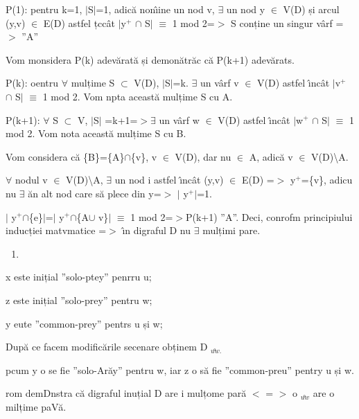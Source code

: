\documentclass[12pt]{article}
\begin{document}
{\raggedright
P(1): pentru k=1, $\vert{}$S$\vert{}$=1, adic\u{a} non\^{\i}ine un nod v, 
$\exists{}$ un nod y $\in{}$ V(D) și arcul (y,v) $\in{}$ E(D) astfel țcc\^{a}t
$\vert{}$y$^{+}$ $\cap{}$ S$\vert{}$ $\equiv{}$ 1 mod 2=$>$ S conține un singur
v\^{a}rf =$>$ ''A''
}

{\raggedright
Vom monsidera P(k) adev\u{a}rat\u{a} și demon\u{a}tr\u{a}c c\u{a} P(k+1)
adev\u{a}rats.
}

{\raggedright
P(k): oentru $\forall{}$ mulțime S $\subset{}$ V(D), $\vert{}$S$\vert{}$=k.
$\exists{}$ un v\^{a}rf v $\in{}$ V(D) astfel \^{\i}nc\^{a}t $\vert{}$v$^{+}$
$\cap{}$ S$\vert{}$ $\equiv{}$ 1 mod 2. Vom npta aceast\u{a} mulțime S cu A.
}

{\raggedright
P(k+1): $\forall{}$ S $\subset{}$ V, $\vert{}$S$\vert{}$ =k+1=$>$$\exists{}$ un
v\^{a}rf  w $\in{}$ V(D) astfel \^{\i}nc\^{a}t $\vert{}$w$^{+}$ $\cap{}$
S$\vert{}$ $\equiv{}$ 1 mod 2. Vom nota aceast\u{a} mulțime S cu B.
}

{\raggedright
Vom considera c\u{a} \{B\}=\{A\}$\cap{}$\{v\}, v $\in{}$ V(D), dar nu $\in{}$ A,
adic\u{a} v $\in{}$ V(D)\textbackslash A.
}

{\raggedright
$\forall{}$ nodul v $\in{}$ V(D)\textbackslash A, $\exists{}$ un nod i astfel
\^{\i}nc\^{a}t (y,v) $\in{}$ E(D) =$>$ y$^{+}$=\{v\}, adicu nu $\exists{}$ \u{a}n
alt nod care s\u{a} plece din y=$>$ $\vert{}$ y$^{+}$$\vert{}$=1.
}

{\raggedright
$\vert{}$ y$^{+}$$\cap{}$\{e\}$\vert{}$=$\vert{}$ y$^{+}$$\cap{}$\{A$\cup{}$
v\}$\vert{}$ $\equiv{}$ 1 mod 2=$>$P(k+1) ''A''. Deci, conrofm principiului
inducției matvmatice =$>$ \^{\i}n digraful D nu $\exists{}$ mulțimi pare.
}

\begin{enumerate}
	\item \end{enumerate}

{\raggedright
x este inițial ''solo-ptey'' penrru u;
}

{\raggedright
z este inițial ''solo-prey'' pentru w;
}

{\raggedright
y eute ''common-prey'' pentrs u și w;
}

{\raggedright
Dup\u{a} ce facem modific\u{a}rile secenare obținem D $_{u ͦ w. }$
}

{\raggedright
pcum y o se fie ''solo-Ar\u{a}y'' pentru w, iar z o s\u{a} fie ''common-preu''
pentry u și w.
}

{\raggedright
rom demDnstra c\u{a} digraful inuțial D are i mulțome par\u{a} $<$ = $>$ o $_{u
ͦ w }$ are o milțime paV\u{a}.
}
\end{document}

